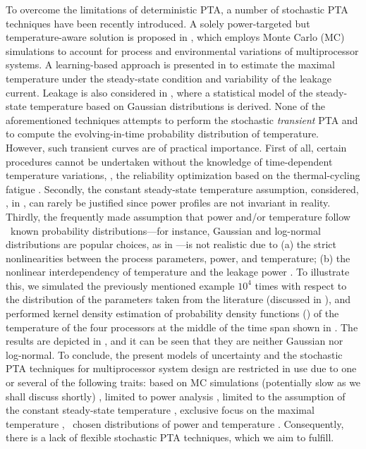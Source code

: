 To overcome the limitations of deterministic PTA, a number of stochastic PTA techniques have been recently introduced. A solely power-targeted but temperature-aware solution is proposed in \cite{chandra2010}, which employs Monte Carlo (MC) simulations to account for process and environmental variations of multiprocessor systems. A learning-based approach is presented in \cite{juan2011} to estimate the maximal temperature under the steady-state condition and variability of the leakage current. Leakage is also considered in \cite{juan2012}, where a statistical model of the steady-state temperature based on Gaussian distributions is derived. None of the aforementioned techniques attempts to perform the stochastic \emph{transient} PTA and to compute the evolving-in-time probability distribution of temperature. However, such transient curves are of practical importance. First of all, certain procedures cannot be undertaken without the knowledge of time-dependent temperature variations, \eg, the reliability optimization based on the thermal-cycling fatigue \cite{ukhov2012}. Secondly, the constant steady-state temperature assumption, considered, \eg, in \cite{juan2011, juan2012}, can rarely be justified since power profiles are not invariant in reality. Thirdly, the frequently made assumption that power and/or temperature follow \apriori\ known probability distributions---for instance, Gaussian and log-normal distributions are popular choices, as in \cite{juan2012, srivastava2010}---is not realistic due to (a) the strict nonlinearities between the process parameters, power, and temperature; (b) the nonlinear interdependency of temperature and the leakage power \cite{liu2007}. To illustrate this, we simulated the previously mentioned example $10^4$ times with respect to the distribution of the parameters taken from the literature (discussed in ), and performed kernel density estimation of probability density functions (\pdfs) of the temperature of the four processors at the middle of the time span shown in . The results are depicted in , and it can be seen that they are neither Gaussian nor log-normal. To conclude, the present models of uncertainty and the stochastic PTA techniques for multiprocessor system design are restricted in use due to one or several of the following traits: based on MC simulations (potentially slow as we shall discuss shortly) \cite{chandra2010}, limited to power analysis \cite{chandra2010}, limited to the assumption of the constant steady-state temperature \cite{juan2011, juan2012}, exclusive focus on the maximal temperature \cite{juan2011}, \apriori\ chosen distributions of power and temperature \cite{juan2012, srivastava2010}. Consequently, there is a lack of flexible stochastic PTA techniques, which we aim to fulfill.

